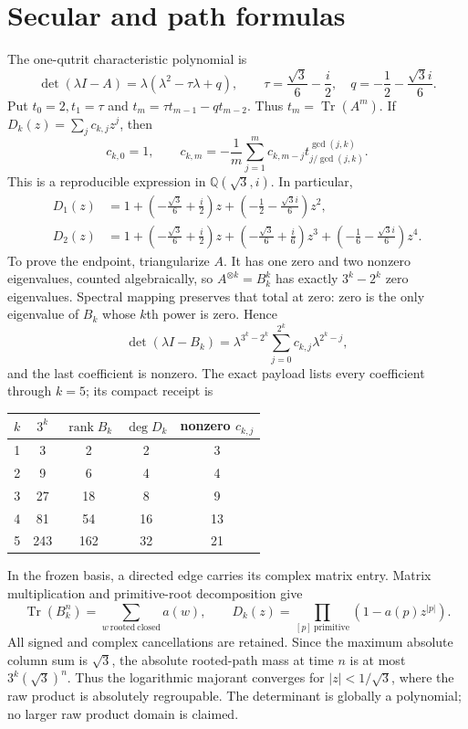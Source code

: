 \documentclass[10pt]{article}
\newcommand{\Tr}{\operatorname{Tr}}
\newcommand{\rank}{\operatorname{rank}}
\begin{document}
\section{Secular and path formulas}
The one-qutrit characteristic polynomial is
\[
 \det(\lambda I-A)=\lambda(\lambda^2-\tau\lambda+q),\qquad
 \tau=\frac{\sqrt3}{6}-\frac i2,\quad
 q=-\frac12-\frac{\sqrt3 i}{6}.
\]
Put $t_0=2,t_1=\tau$ and
$t_m=\tau t_{m-1}-qt_{m-2}$.  Thus $t_m=\Tr(A^m)$.  If
$D_k(z)=\sum_jc_{k,j}z^j$, then
\begin{equation}
 c_{k,0}=1,\qquad
 c_{k,m}=-\frac1m\sum_{j=1}^m c_{k,m-j}
 t_{j/\gcd(j,k)}^{\gcd(j,k)}.                         \tag{6}
\end{equation}
This is a reproducible expression in $\mathbb Q(\sqrt3,i)$.  In particular,
\begin{align*}
 D_1(z)&=1+\left(-\frac{\sqrt3}{6}+\frac i2\right)z
 +\left(-\frac12-\frac{\sqrt3 i}{6}\right)z^2,\\
 D_2(z)&=1+\left(-\frac{\sqrt3}{6}+\frac i2\right)z
 +\left(-\frac{\sqrt3}{6}+\frac i6\right)z^3
 +\left(-\frac16-\frac{\sqrt3 i}{6}\right)z^4.
\end{align*}
To prove the endpoint, triangularize $A$.  It has one zero and two nonzero
eigenvalues, counted algebraically, so $A^{\otimes k}=B_k^k$ has exactly
$3^k-2^k$ zero eigenvalues.  Spectral mapping preserves that total at zero:
zero is the only eigenvalue of $B_k$ whose $k$th power is zero.  Hence
\begin{equation}
 \det(\lambda I-B_k)=\lambda^{3^k-2^k}
 \sum_{j=0}^{2^k}c_{k,j}\lambda^{2^k-j},             \tag{7}
\end{equation}
and the last coefficient is nonzero.  The exact payload lists every
coefficient through $k=5$; its compact receipt is
\begin{center}\small
\begin{tabular}{@{}ccccc@{}}
\toprule
$k$ & $3^k$ & $\rank B_k$ & $\deg D_k$ & nonzero $c_{k,j}$\\
\midrule
1 & 3   & 2   & 2  & 3\\
2 & 9   & 6   & 4  & 4\\
3 & 27  & 18  & 8  & 9\\
4 & 81  & 54  & 16 & 13\\
5 & 243 & 162 & 32 & 21\\
\bottomrule
\end{tabular}
\end{center}

In the frozen basis, a directed edge carries its complex matrix entry.  Matrix
multiplication and primitive-root decomposition give
\begin{equation}
 \Tr(B_k^n)=\sum_{w\ \mathrm{rooted\ closed}}a(w),\qquad
 D_k(z)=\prod_{[p]\ \mathrm{primitive}}
 (1-a(p)z^{|p|}).                                    \tag{8}
\end{equation}
All signed and complex cancellations are retained.  Since the maximum
absolute column sum is $\sqrt3$, the absolute rooted-path mass at time $n$ is
at most $3^k(\sqrt3)^n$.  Thus the logarithmic majorant converges for
$|z|<1/\sqrt3$, where the raw product is absolutely regroupable.  The
determinant is globally a polynomial; no larger raw product domain is claimed.
\end{document}
